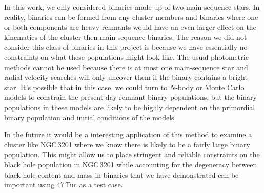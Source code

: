 In this work, we only considered binaries made up of two main sequence stars. In reality, binaries
can be formed from any cluster members and binaries where one or both components are heavy remnants
would have an even larger effect on the kinematics of the cluster then main-sequence binaries. The
reason we did not consider this class of binaries in this project is because we have essentially no
constraints on what these populations might look like. The usual photometric methods cannot be used
because there is at most one main-sequence star and radial velocity searches will only uncover them
if the binary contains a bright star. It's possible that in this case, we could turn to $N$-body or
Monte Carlo models to constrain the present-day remnant binary populations, but the binary
populations in these models are likely to be highly dependent on the primordial binary population
and initial conditions of the models.

In the future it would be a interesting application of this method to examine a cluster like
NGC\,3201 where we know there is likely to be a fairly large binary population. This might allow us
to place stringent and reliable constraints on the black hole population in NGC\,3201 while
accounting for the degeneracy between black hole content and mass in binaries that we have
demonstrated can be important using 47\,Tuc as a test case.